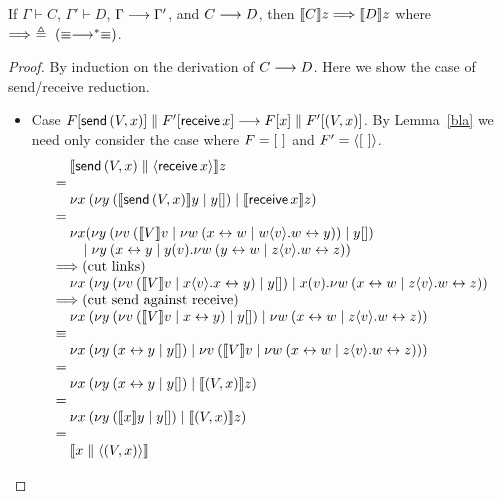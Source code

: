 \documentclass[orivec,envcountsame]{llncs}
\begin{document}
\begin{theorem}
If $\Gamma \vdash C$, $\Gamma' \vdash D$, $\Gamma \longrightarrow \Gamma'$, and $C \longrightarrow D$, then $\llbracket C \rrbracket z
\Longrightarrow \llbracket D \rrbracket z$ where $\Longrightarrow ~\triangleq~ (\equiv\longrightarrow^*\equiv)$.
\end{theorem}
\begin{proof}
By induction on the derivation of $C \longrightarrow D$. Here we show the case of send/receive reduction.
\begin{itemize}
\item Case $F[\mathsf{send} \, (V,x)] \parallel F'[\mathsf{receive} \, x] \longrightarrow F[x]
  \parallel F'[(V,x)]$.
%
By Lemma~\ref{bla} we need only consider the case where $F = [~]$ and $F' = \langle [~] \rangle$.
\[
\bl
\quad \tocp{\gvconst{send} \app (V,x) \parallel \distinguish{\gvconst{receive} \app x}}z \\
= \\
\quad \cut{x}{}
        {\cut{y}{}{\tocp{\gvconst{send} \app (V,x)}y}{y[]}}
        {\tocp{\gvconst{receive} \app x}z} \\
= \\
\quad
  \nu x(
    {\cut{y}{}{
     \cut{v}{}{\tocp{V}v}
      {\cut{w}{}{\link{x}{w}}{w\sd{v}.\link{w}{y}}}}{y[]}} \\
\qquad \mid
    {\cut{y}{}
       {\link{x}{y}}
       {y(v).\cut{w}{}{\link{y}{w}}{z\sd{v}.\link{w}{z}}}} \\
\Longrightarrow (\text{cut links}) \\
\quad
  \cut{x}{}
    {\cut{y}{}
       {\cut{v}{}{\tocp{V}v}
         {x\sd{v}.\link{x}{y}}}
       {y[]}}
    {x(v).\cut{w}{}{\link{x}{w}}{z\sd{v}.\link{w}{z}}} \\
\Longrightarrow (\text{cut send against receive}) \\
\quad
  \cut{x}{}
    {\cut{y}{}
       {\cut{v}{}{\tocp{V}v}
         {\link{x}{y}}}
       {y[]}}
    {\cut{w}{}{\link{x}{w}}{z\sd{v}.\link{w}{z}}} \\
\equiv \\
\quad 
  \cut{x}{}
    {\cut{y}{}{\link x y}{y[]}}
    {\cut{v}{}{\tocp{V}v}
      {\cut{w}{}{\link{x}{w}}
         {z\sd{v}.\link{w}{z}}}} \\
= \\
\quad
  \cut{x}{}
    {\cut{y}{}{\link x y}{y[]}}
    {\tocp{(V,x)}z} \\
= \\
\quad \cut{x}{}{\cut{y}{}{\tocp{x}y}{y[]}}{\tocp{(V,x)}z} \\
= \\
\quad \tocp{x \parallel \distinguish{(V,x)}} \\
\el
\]


\end{itemize}
\end{proof}
\end{document}
